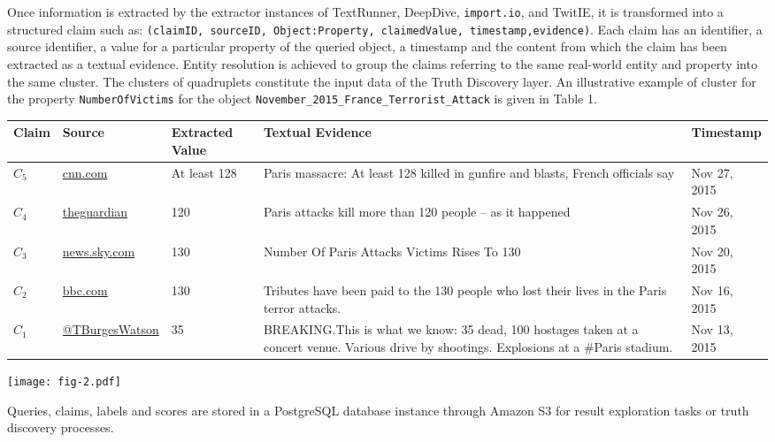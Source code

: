 Once information is extracted by the extractor instances of TextRunner, DeepDive, {\small\texttt{import.io}}, and TwitIE, 
it is transformed into a  structured  claim such as: 
{\small\texttt{(\textsf{claimID}, \textsf{sourceID}, \textsf{Object:Property}, \textsf{claimedValue}, \textsf{timestamp},\textsf{evidence})}}. Each claim has an identifier, a source identifier, a value for a particular property of the queried object, a timestamp and the content from which the claim has been extracted as a textual evidence.
Entity resolution is achieved to group the claims referring to the same real-world entity and  property into the same cluster.
The clusters of quadruplets constitute the input data of the Truth Discovery layer. 
An illustrative example of cluster for the property {\small\texttt{NumberOfVictims}} for the object {\small\texttt{November\_2015\_France\_Terrorist\_Attack}}  is given in Table 1.
\begin{table*}[ht]
 \begin{minipage}[b]{0.66\textwidth}
    \centering
  \scriptsize  
\begin{tabular}{|p{.8cm}|p{2cm}|p{1.2cm}|p{4.5cm}|p{1.5cm}|}
\hline
{\bf Claim}  & {\bf Source}&{\bf Extracted Value} & {\bf Textual Evidence}&{\bf Timestamp} \\
\hline
$C_5$& \scriptsize{\url{cnn.com}} &At least 128&  Paris massacre: At least 128 killed in gunfire and blasts, French officials say&Nov 27, 2015\\
\hline
$C_4$& \scriptsize{\url{theguardian}}&120&Paris attacks kill more than 120 people -- as it happened& Nov 26, 2015\\
\hline
$C_3$& \scriptsize{\url{news.sky.com}}&130&Number Of Paris Attacks Victims Rises To 130&Nov 20, 2015\\
\hline
$C_2$& \scriptsize{\url{bbc.com}}&130&Tributes have been paid to the 130 people who lost their lives in the Paris terror attacks.&Nov 16, 2015\\
\hline
$C_1$& \scriptsize{\url{@TBurgesWatson}}&35& BREAKING.This is what we know: 35 dead, 100 hostages taken at a concert venue. Various drive by shootings. Explosions at a \#Paris stadium. & Nov 13, 2015\\
\hline
      \end{tabular}
    \end{minipage}
   \hfill
  \begin{minipage}[b]{0.3\textwidth}
    \centering
 
  \texttt{[image: fig-2.pdf]}
 
  \end{minipage}
\end{table*}


Queries, claims,  labels and scores are stored in a PostgreSQL database instance through Amazon S3 for result exploration tasks or truth discovery processes.
